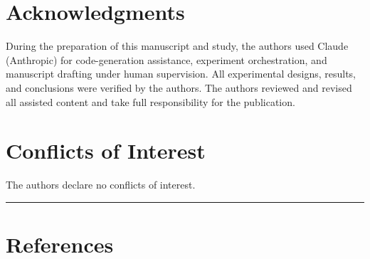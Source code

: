 \documentclass[
  10pt,
  a4paper,
]{article}
\begin{document}
\section{Acknowledgments}\label{acknowledgments}

During the preparation of this manuscript and study, the authors used
Claude (Anthropic) for code-generation assistance, experiment
orchestration, and manuscript drafting under human supervision. All
experimental designs, results, and conclusions were verified by the
authors. The authors reviewed and revised all assisted content and take
full responsibility for the publication.

\section{Conflicts of Interest}\label{conflicts-of-interest}

The authors declare no conflicts of interest.

\begin{center}\rule{0.5\linewidth}{0.5pt}\end{center}

\section{References}\label{references}
\end{document}
